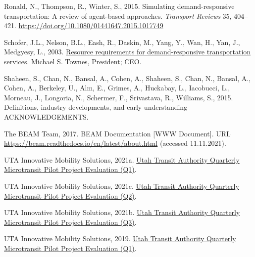 \documentclass[
]{report}
\newlength{\cslhangindent}
\newlength{\cslentryspacingunit} %
\newenvironment{CSLReferences}[2] %
 {%
  \setlength{\parindent}{0pt}
  \ifodd #1
  \let\oldpar\par
  \def\par{\hangindent=\cslhangindent\oldpar}
  \fi
  \setlength{\parskip}{#2\cslentryspacingunit}
 }%
 {}
\begin{document}
\begin{CSLReferences}{1}{0}
\leavevmode{}%
Ronald, N., Thompson, R., Winter, S., 2015. Simulating demand-responsive transportation: A review of agent-based approaches. \emph{Transport Reviews} 35, 404--421. \url{https://doi.org/10.1080/01441647.2015.1017749}

\leavevmode{}%
Schofer, J.L., Nelson, B.L., Eash, R., Daskin, M., Yang, Y., Wan, H., Yan, J., Medgyesy, L., 2003. \href{http://www.national-academies.org/trb/bookstore}{Resource requirements for demand-responsive transportation services}. Michael S. Townes, President; CEO.

\leavevmode{}%
Shaheen, S., Chan, N., Bansal, A., Cohen, A., Shaheen, S., Chan, N., Bansal, A., Cohen, A., Berkeley, U., Alm, E., Grimes, A., Huckabay, L., Iacobucci, L., Morneau, J., Longoria, N., Schermer, F., Srivastava, R., Williams, S., 2015. Definitions, industry developments, and early understanding ACKNOWLEDGEMENTS.

\leavevmode{}%
The BEAM Team, 2017. {BEAM Documentation} {[}WWW Document{]}. URL \url{https://beam.readthedocs.io/en/latest/about.html} (accessed 11.11.2021).

\leavevmode{}%
UTA Innovative Mobility Solutions, 2021a. \href{https://www.rideuta.com/-/media/Files/Services/Via/Final_UTA_microtransit_pilot_Q1_report.ashx?la=en}{{Utah Transit Authority Quarterly Microtransit Pilot Project Evaluation (Q1)}}.

\leavevmode{}%
UTA Innovative Mobility Solutions, 2021c. \href{https://www.rideuta.com/-/media/Files/Services/Via/Final_UTA_Microtransit_Pilot_Q2_Report.ashx?la=en}{{Utah Transit Authority Quarterly Microtransit Pilot Project Evaluation (Q2)}}.

\leavevmode{}%
UTA Innovative Mobility Solutions, 2021b. \href{https://www.rideuta.com/-/media/Files/Services/Via/Final_UTA_Microtransit_Pilot_Q3_Report.ashx?la=en}{{Utah Transit Authority Quarterly Microtransit Pilot Project Evaluation (Q3)}}.

\leavevmode{}%
UTA Innovative Mobility Solutions, 2019. \href{https://www.rideuta.com/-/media/Files/About-UTA/Reports/Via/Microtransit_Evaluation_Dec_2019.ashx}{{Utah Transit Authority Quarterly Microtransit Pilot Project Evaluation (Q1)}}.


\end{CSLReferences}
\end{document}
